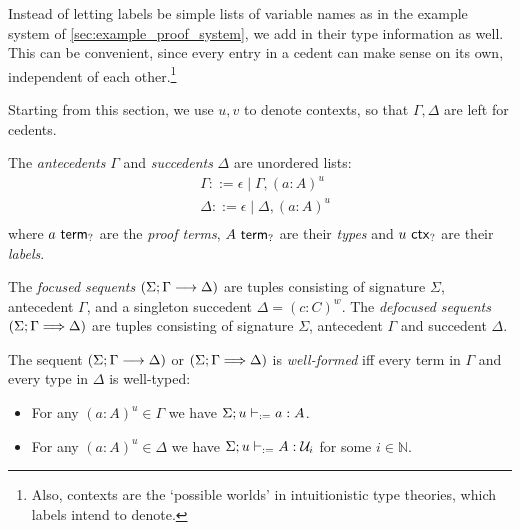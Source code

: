 \documentclass[twoside]{report}
\begin{document}
Instead of letting labels be simple lists of variable names as in the example system of \cref{sec:example_proof_system}, we add in their type information as well. This can be convenient, since every entry in a cedent can make sense on its own, independent of each other.\footnote{Also, contexts are the `possible worlds' in intuitionistic type theories, which labels intend to denote.}

Starting from this section, we use $u, v$ to denote contexts, so that $\Gamma, \Delta$ are left for cedents.

\begin{definition}[Cedents]
    \label{def:cedents}
    The \emph{antecedents} $\Gamma$ and \emph{succedents} $\Delta$ are unordered lists:
    $$
        \begin{aligned}
             & \Gamma ::=
            \epsilon \mid \Gamma, (a : A)^u \\
             & \Delta ::=
            \epsilon \mid \Delta, (a : A)^u \\
        \end{aligned}
    $$
    where $a \ \mathsf{term}_{?}$ are the \emph{proof terms}, $A \ \mathsf{term}_{?}$ are their \emph{types} and $u \ \mathsf{ctx}_{?}$ are their \emph{labels}.
\end{definition}

\begin{definition}[Sequents]
    \label{def:sequents}
    The \emph{focused sequents} $(\Sigma; \Gamma \longrightarrow \Delta)$ are tuples consisting of signature $\Sigma$, antecedent $\Gamma$, and a singleton succedent $\Delta = (c : C)^w$. The \emph{defocused sequents} $(\Sigma; \Gamma \Longrightarrow \Delta)$ are tuples consisting of signature $\Sigma$, antecedent $\Gamma$ and succedent $\Delta$.
\end{definition}

\begin{definition}
    \label{def:well_formed_sequents}
    The sequent $(\Sigma; \Gamma \longrightarrow \Delta)$ or $(\Sigma; \Gamma \Longrightarrow \Delta)$ is \emph{well-formed} iff every term in $\Gamma$ and every type in $\Delta$ is well-typed:
    \begin{itemize}[noitemsep]
        \item For any $(a : A)^u \in \Gamma$ we have $\Sigma; u \vdash_{:=} a : A$.
        \item For any $(a : A)^u \in \Delta$ we have $\Sigma; u \vdash_{:=} A : \mathcal U_i$ for some $i\in\mathbb N$.
    \end{itemize}
\end{definition}
\end{document}
